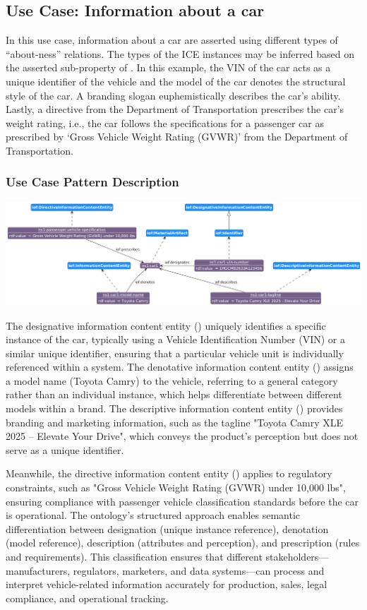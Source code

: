 \subsection*{Use Case: Information about a car}
In this use case, information about a car are asserted using different types of ``about-ness'' relations. The types of the ICE instances may be inferred based on the asserted sub-property of . In this example, the VIN of the car acts as a unique identifier of the vehicle and the model of the car denotes the structural style of the car. A branding slogan euphemistically describes the car's ability. Lastly, a directive from the Department of Transportation prescribes the car's weight rating, i.e., the car follows the specifications for a passenger car as prescribed by `Gross Vehicle Weight Rating (GVWR)' from the Department of Transportation.   

\subsubsection*{Use Case Pattern Description}

\includegraphics[scale=0.35]{scenarios/information-and-aboutness/images/uc1-ices.png}

The designative information content entity () uniquely identifies a specific instance of the car, typically using a Vehicle Identification Number (VIN) or a similar unique identifier, ensuring that a particular vehicle unit is individually referenced within a system. The denotative information content entity () assigns a model name (Toyota Camry) to the vehicle, referring to a general category rather than an individual instance, which helps differentiate between different models within a brand. The descriptive information content entity () provides branding and marketing information, such as the tagline "Toyota Camry XLE 2025 – Elevate Your Drive", which conveys the product’s perception but does not serve as a unique identifier.

Meanwhile, the directive information content entity () applies to regulatory constraints, such as "Gross Vehicle Weight Rating (GVWR) under 10,000 lbs", ensuring compliance with passenger vehicle classification standards before the car is operational. The ontology’s structured approach enables semantic differentiation between designation (unique instance reference), denotation (model reference), description (attributes and perception), and prescription (rules and requirements). This classification ensures that different stakeholders—manufacturers, regulators, marketers, and data systems—can process and interpret vehicle-related information accurately for production, sales, legal compliance, and operational tracking.


